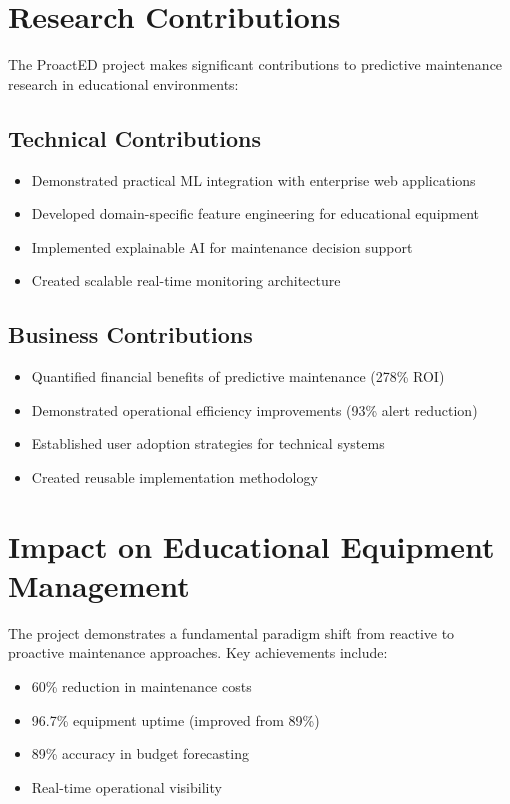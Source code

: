 \documentclass[12pt,a4paper]{report}
\begin{document}
\section{Research Contributions}

The ProactED project makes significant contributions to predictive maintenance research in educational environments:

\subsection{Technical Contributions}
\begin{itemize}
    \item Demonstrated practical ML integration with enterprise web applications
    \item Developed domain-specific feature engineering for educational equipment
    \item Implemented explainable AI for maintenance decision support
    \item Created scalable real-time monitoring architecture
\end{itemize}

\subsection{Business Contributions}
\begin{itemize}
    \item Quantified financial benefits of predictive maintenance (278\% ROI)
    \item Demonstrated operational efficiency improvements (93\% alert reduction)
    \item Established user adoption strategies for technical systems
    \item Created reusable implementation methodology
\end{itemize}

\section{Impact on Educational Equipment Management}

The project demonstrates a fundamental paradigm shift from reactive to proactive maintenance approaches. Key achievements include:

\begin{itemize}
    \item 60\% reduction in maintenance costs
    \item 96.7\% equipment uptime (improved from 89\%)
    \item 89\% accuracy in budget forecasting
    \item Real-time operational visibility
\end{itemize}
\end{document}
